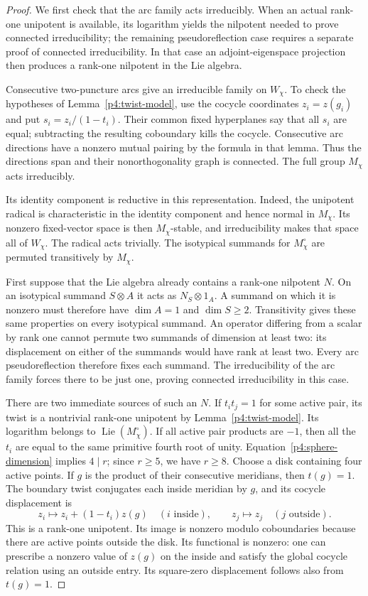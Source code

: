 \documentclass[11pt]{article}
\theoremstyle{plain}
\theoremstyle{definition}
\theoremstyle{remark}
\numberwithin{equation}{section}
\begin{document}
\begin{proof}
We first check that the arc family acts irreducibly.  When an actual
rank-one unipotent is available, its logarithm yields the nilpotent needed
to prove connected irreducibility; the remaining pseudoreflection case
requires a separate proof of connected irreducibility.  In that case an
adjoint-eigenspace projection then produces a rank-one nilpotent in the
Lie algebra.

Consecutive two-puncture arcs give an irreducible family on
$W_\chi$.  To check the hypotheses of
Lemma~\ref{p4:twist-model}, use the cocycle coordinates
$z_i=z(g_i)$ and put $s_i=z_i/(1-t_i)$.  Their common fixed
hyperplanes say that all $s_i$ are equal; subtracting the resulting
coboundary kills the cocycle.  Consecutive arc directions have a
nonzero mutual pairing by the formula in that lemma.  Thus the
directions span and their nonorthogonality graph is connected.
The full group $M_\chi$ acts irreducibly.

Its identity component is reductive in this representation.
Indeed, the unipotent radical is characteristic in the identity
component and hence normal in $M_\chi$.  Its nonzero fixed-vector
space is then $M_\chi$-stable, and irreducibility makes that space
all of $W_\chi$.  The radical acts trivially.  The isotypical
summands for $M_\chi^\circ$ are permuted transitively by
$M_\chi$.

First suppose that the Lie algebra already contains a rank-one
nilpotent $N$.  On an isotypical summand $S\otimes A$ it acts as
$N_S\otimes1_A$.  A summand on which it is nonzero must therefore
have $\dim A=1$ and $\dim S\ge2$.  Transitivity gives these same
properties on every isotypical summand.  An operator differing
from a scalar by rank one cannot permute two summands of dimension
at least two: its displacement on either of the summands would
have rank at least two.  Every arc pseudoreflection therefore fixes
each summand.  The irreducibility of the arc family forces there
to be just one, proving connected irreducibility in this case.

There are two immediate sources of such an $N$.  If $t_it_j=1$
for some active pair, its twist is a nontrivial rank-one unipotent
by Lemma~\ref{p4:twist-model}.  Its logarithm belongs to
$\operatorname{Lie}(M_\chi^\circ)$.  If all active pair products are $-1$, then
all the $t_i$ are equal to the same primitive fourth root of unity.
Equation~\eqref{p4:sphere-dimension} implies $4\mid r$; since
$r\ge5$, we have $r\ge8$.  Choose a disk containing four active
points.  If $g$ is the product of their consecutive meridians,
then $t(g)=1$.  The boundary twist conjugates each inside meridian
by $g$, and its cocycle displacement is
\[
 z_i\longmapsto z_i+(1-t_i)z(g)\quad(i\text{ inside}),
 \qquad z_j\longmapsto z_j\quad(j\text{ outside}).
\]
This is a rank-one unipotent.  Its image is nonzero modulo
coboundaries because there are active points outside the disk.
Its functional is nonzero: one can prescribe a nonzero value of
$z(g)$ on the inside and satisfy the global cocycle relation using
an outside entry.  Its square-zero displacement follows also from
$t(g)=1$.


\end{proof}
\end{document}
